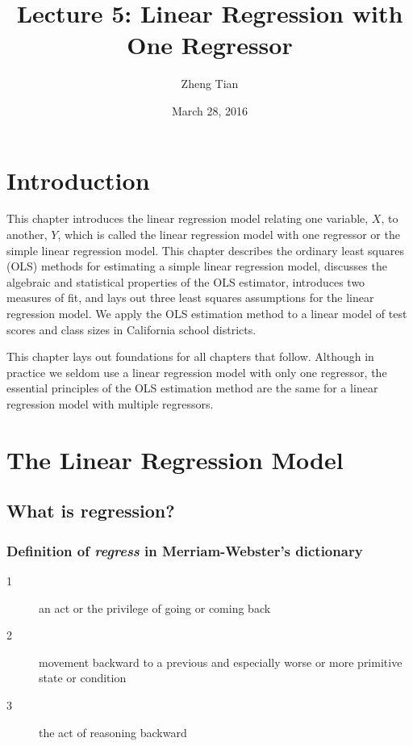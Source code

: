 \documentclass[a4paper,11pt]{article}
\author{Zheng Tian}
\date{March 28, 2016}
\title{Lecture 5: Linear Regression with One Regressor}
\begin{document}
\maketitle

\section{Introduction}
\label{sec:org91069ec}
This chapter introduces the linear regression model relating one
variable, \(X\), to another, \(Y\), which is called the linear regression
model with one regressor or the simple linear regression model. This
chapter describes the ordinary least squares (OLS) methods for
estimating a simple linear regression model, discusses the algebraic
and statistical properties of the OLS estimator, introduces two
measures of fit, and lays out three least squares assumptions for the
linear regression model. We apply the OLS estimation method to a
linear model of test scores and class sizes in California school
districts. 

This chapter lays out foundations for all chapters that
follow. Although in practice we seldom use a linear regression model
with only one regressor, the essential principles of the OLS estimation
method are the same for a linear regression model with multiple
regressors. 


\section{The Linear Regression Model}
\label{sec:orgb1ff2b1}
\subsection{What is regression?}
\label{sec:org4c3f4b2}
\subsubsection*{Definition of \emph{regress} in Merriam-Webster's dictionary}
\label{sec:org4dacdb1}

\begin{description}
\item[{1}] an act or the privilege of going or coming back
\item[{2}] movement backward to a previous and especially worse or more primitive state or condition
\item[{3}] the act of reasoning backward
\end{description}
\end{document}
